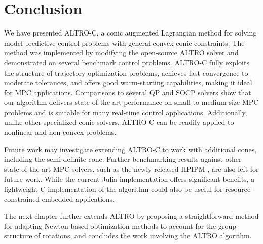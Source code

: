 \documentclass[../root.tex]{subfiles}
\begin{document}
\section{Conclusion}
We have presented ALTRO-C, a conic augmented Lagrangian method for solving
model-predictive control problems with general convex conic constraints. The
method was implemented by modifying the open-source ALTRO solver and
demonstrated on several benchmark control problems. ALTRO-C fully exploits
the structure of trajectory optimization problems, achieves fast convergence
to moderate tolerances, and offers good warm-starting capabilities, making it
ideal for MPC applications. Comparisons to several QP and SOCP solvers show
that our algorithm delivers state-of-the-art performance on
small-to-medium-size MPC problems and is suitable for many real-time control
applications. Additionally, unlike other specialized conic solvers, ALTRO-C
can be readily applied to nonlinear and non-convex problems.

Future work may investigate extending ALTRO-C to work with additional cones,
including the semi-definite cone. Further benchmarking results against other
state-of-the-art MPC solvers, such as the newly released HPIPM
\cite{frison_HPIPM_2020}, are also left for future work. While the current
Julia implementation offers significant benefits, a lightweight C
implementation of the algorithm could also be useful for resource-constrained
embedded applications. 

The next chapter further extends ALTRO by proposing a straightforward method for 
adapting Newton-based optimization methods to account for the group structure of 
rotations, and concludes the work involving the ALTRO algorithm.
\end{document}
